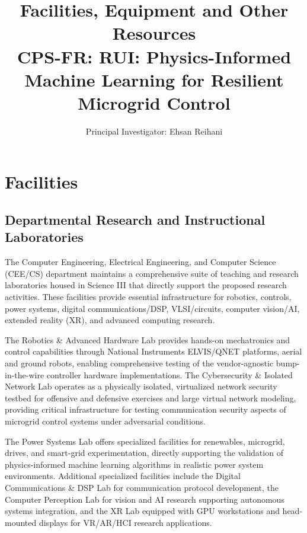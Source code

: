 \documentclass[12pt]{article}
\begin{document}
\title{\Large\textbf{Facilities, Equipment and Other Resources\\CPS-FR: RUI: Physics-Informed Machine Learning for Resilient Microgrid Control}}
\author{Principal Investigator: Ehsan Reihani}
\date{}

\maketitle

\section{Facilities}

\subsection{Departmental Research and Instructional Laboratories}

The Computer Engineering, Electrical Engineering, and Computer Science (CEE/CS) department maintains a comprehensive suite of teaching and research laboratories housed in Science III that directly support the proposed research activities. These facilities provide essential infrastructure for robotics, controls, power systems, digital communications/DSP, VLSI/circuits, computer vision/AI, extended reality (XR), and advanced computing research.

The Robotics \& Advanced Hardware Lab provides hands-on mechatronics and control capabilities through National Instruments ELVIS/QNET platforms, aerial and ground robots, enabling comprehensive testing of the vendor-agnostic bump-in-the-wire controller hardware implementations. The Cybersecurity \& Isolated Network Lab operates as a physically isolated, virtualized network security testbed for offensive and defensive exercises and large virtual network modeling, providing critical infrastructure for testing communication security aspects of microgrid control systems under adversarial conditions.

The Power Systems Lab offers specialized facilities for renewables, microgrid, drives, and smart-grid experimentation, directly supporting the validation of physics-informed machine learning algorithms in realistic power system environments. Additional specialized facilities include the Digital Communications \& DSP Lab for communication protocol development, the Computer Perception Lab for vision and AI research supporting autonomous systems integration, and the XR Lab equipped with GPU workstations and head-mounted displays for VR/AR/HCI research applications.
\end{document}

